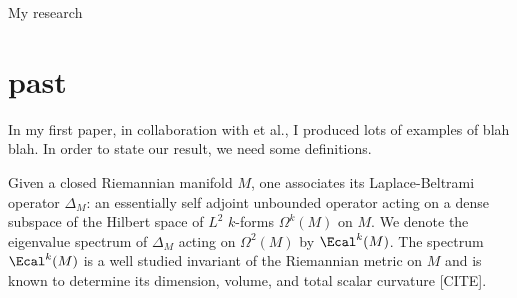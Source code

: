 \documentclass[12pt]{article}
\theoremstyle{plain}
\theoremstyle{remark}
\begin{document}





My research

\section{past}
In my first paper, in collaboration with et al., I produced lots of examples of blah blah. In order to state our result, we need some definitions.

Given a closed Riemannian manifold $M$, one associates its Laplace-Beltrami operator $\Delta_M$: an essentially self adjoint unbounded operator acting on a dense subspace of the Hilbert space of $L^2$ $k$-forms $\Omega^k(M)$ on $M$. We denote the {\rm eigenvalue spectrum} of $\Delta_M$ acting on $\Omega^2(M)$ by $\Ecal^k(M)$. The spectrum $\Ecal^k(M)$ is a well studied invariant of the Riemannian metric on $M$ and is known to determine its dimension, volume, and total scalar curvature [CITE].
\end{document}
